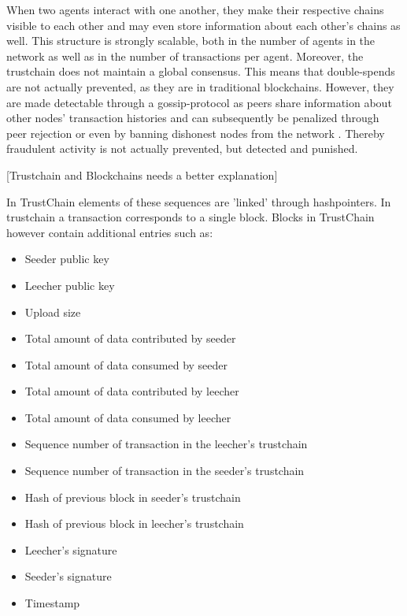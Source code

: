 \documentclass[11pt,a4paper]{article}
\theoremstyle{definition}
\theoremstyle{theorem}
\theoremstyle{proposition}
\theoremstyle{corollary}
\theoremstyle{lemma}
\theoremstyle{example}
\theoremstyle{remark}
\begin{document}
\noindent{}When two agents interact with one another, they make their respective chains visible to each other and may even store information about each other's chains as well. This structure is strongly scalable, both in the number of agents in the network as well as in the number of transactions per agent. Moreover, the trustchain does not maintain a global consensus. This means that double-spends are not actually prevented, as they are in traditional blockchains. However, they are made detectable through a gossip-protocol as peers share information about other nodes' transaction histories and can subsequently be penalized through peer rejection or even by banning dishonest nodes from the network \cite{TrustChain: A Sybil-resistant scalable blockchain}. Thereby fraudulent activity is not actually prevented, but detected and punished.\vspace{1em}\\

\noindent{}\begin{center} [Trustchain and Blockchains needs a better explanation] \vspace{1em}\\\end{center}
\noindent{}In TrustChain elements of these sequences are 'linked' through hashpointers. In trustchain a transaction corresponds to a single block. Blocks in TrustChain however contain additional entries such as:

\begin{itemize}
\item Seeder public key 
\item Leecher public key
\item Upload size
\item Total amount of data contributed by seeder
\item Total amount of data consumed by seeder
\item Total amount of data contributed by leecher
\item Total amount of data consumed by leecher
\item Sequence number of transaction in the leecher's trustchain
\item Sequence number of transaction in the seeder's trustchain
\item Hash of previous block in seeder's trustchain
\item Hash of previous block in leecher's trustchain
\item Leecher's signature
\item Seeder's signature
\item Timestamp
\end{itemize}
\end{document}
